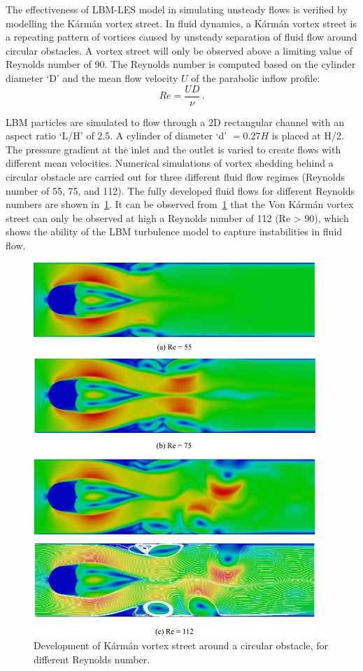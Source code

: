 The effectiveness of LBM-LES model in simulating unsteady flows is verified by 
modelling the K\'{a}rm\'{a}n vortex street. In fluid dynamics, a K\'{a}rm\'{a}n 
vortex street is a repeating pattern of vortices caused by unsteady separation 
of fluid flow around circular obstacles. A vortex street will only be observed 
above a limiting value of Reynolds number of 90. The Reynolds number 
is computed based on the cylinder diameter `D' and the mean flow velocity $U$ 
of the parabolic inflow profile:
%
\begin{equation}
\label{eq:reynolds}
Re=\frac{UD}{\nu}\,.
\end{equation}

LBM particles are simulated to flow through a 2D rectangular channel with an 
aspect ratio `L/H' of 2.5. A cylinder of diameter `d' $=0.27H$ is placed at 
H/2. The pressure gradient at the inlet and the outlet is varied to create 
flows with different mean velocities. Numerical simulations of vortex 
shedding behind a circular obstacle are carried out for three different fluid 
flow regimes (Reynolds number of 55, 75, and 112). The fully developed fluid 
flows for different Reynolds numbers are shown in~\cref{fig:karman}. It can be 
observed from~\cref{fig:karman} that the Von K\'{a}rm\'{a}n vortex street can 
only be observed at high a Reynolds number of 112 (Re > 90), which shows the 
ability of the LBM turbulence model to capture instabilities in fluid flow.
%
\begin{figure}[htbp]
	\centering
	\includegraphics[width=0.95\textwidth]{karman}
	\caption{Development of K\'{a}rm\'{a}n vortex street around a circular 
	obstacle, for different Reynolds number.}
	\label{fig:karman}
\end{figure}


